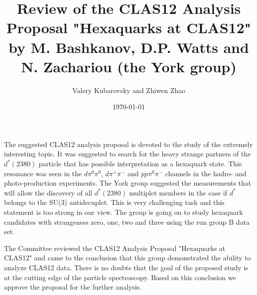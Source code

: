\documentclass[prc,floatfix,superscriptaddress,letter]{revtex4}
\begin{document}
\title{Review of the CLAS12 Analysis Proposal "Hexaquarks at CLAS12"  \\
by M. Bashkanov, D.P. Watts and  N. Zachariou (the York group)}
\author{Valery Kubarovsky and Zhiwen Zhao}
\date{\today}
\maketitle

The suggested CLAS12 analysis proposal is devoted to the study of the extremely interesting topic. It was suggested to search for the heavy strange partners of the $d^*(2380)$ particle that has possible interpretation as a hexaquark state. This resonance was seen in the $d\pi^0\pi^0$, $d\pi^+\pi^-$ and $pp\pi^0\pi^-$ channels in the hadro- and photo-production experiments. The York group suggested the measurements that will allow the discovery of all  $d^*(2380)$ multiplet members in the case if $d^*$ belongs to the SU(3) antidecuplet. This is very challenging task and this statement is too strong in our view. The group is going on to study hexaquark candidates with strangeness zero, one, two and three using the run group B data set.

The Committee reviewed the CLAS12 Analysis Proposal "Hexaquarks at CLAS12"  and came to the conclusion that this group demonstrated the ability to analyze CLAS12 data. There is no doubts that the goal of the proposed study is at the cutting edge of the particle spectroscopy.
Based on this conclusion we approve the proposal for the further analysis. 
\end{document}
